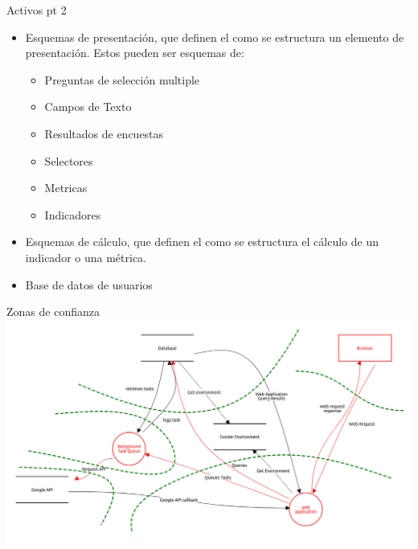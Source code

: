 \documentclass{beamer}
\begin{document}
\begin{frame}{Activos pt 2}
        
    \begin{itemize}
        \item{ Esquemas de presentación, que definen el como se estructura un elemento de presentación. Estos pueden ser esquemas de:
            \begin{itemize}
                \item Preguntas de selección multiple
                \item Campos de Texto
                \item Resultados de encuestas
                \item Selectores
                \item Metricas
                \item Indicadores
            \end{itemize}
        }
        \item{ Esquemas de cálculo, que definen el como se estructura el cálculo de un indicador o una métrica.}
        \item { Base de datos de usuarios }
    \end{itemize}

\end{frame}


\begin{frame}{Zonas de confianza}
    \centering
    \includegraphics[height=0.6\textheight]{./fragments/diagram.png}
    
\end{frame}
\end{document}
